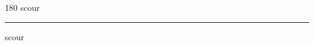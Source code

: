 
\begin{frame}
\begin{center}
\begin{turn}{180}
{\fontsize{2.5cm}{1em}\selectfont scour}
\end{turn}
\vspace{1em}\par  
\hrule
\vspace{1em}\par  
{\fontsize{2.5cm}{1em}\selectfont scour}
\end{center}
\end{frame}
